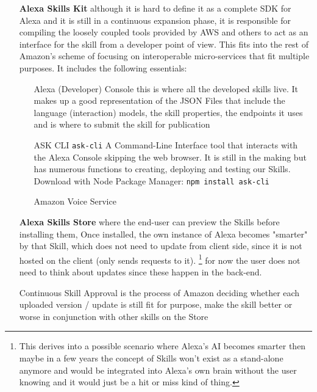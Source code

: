 \begin{itemize}
	\item[\textbf{Alexa Skills Kit}] although it is hard to define it as a complete SDK for Alexa and it is still in a continuous expansion phase, it is responsible for compiling the loosely coupled tools provided by AWS and others to act as an interface for the skill from a developer point of view. This fits into the rest of Amazon's scheme of focusing on interoperable micro-services that fit multiple purposes. It includes the following essentials:
	
	
	\begin{itemize}
		\item [Alexa (Developer) Console] this is where all the developed skills live. It makes up a good representation of the JSON Files that include the language (interaction) models, the skill properties, the endpoints it uses and is where to submit the skill for publication
		\item[ASK CLI] \lstinline|ask-cli| A Command-Line Interface tool that interacts with the Alexa Console skipping the web browser. It is still in the making but has numerous functions to creating, deploying and testing our Skills. Download with Node Package Manager: \texttt{npm install ask-cli}
		\item[Amazon Voice Service] 
	\end{itemize}
	\item[\textbf{Alexa Skills Store}] where the end-user can preview the Skills before installing them, %
	Once installed, the own instance of Alexa becomes "smarter" by that Skill, which does not need to update from client side, since it is not hosted on the client (only sends requests to it). \footnote{This derives into a possible scenario where Alexa's AI becomes smarter then maybe in a few years the concept of Skills won't exist as a stand-alone anymore and would be integrated into Alexa's own brain without the user knowing and it would just be a hit or miss kind of thing.} for now the user does not need to think about updates since these happen in the back-end. 
	
	Continuous Skill Approval is the process of Amazon deciding whether each uploaded version / update is still fit for purpose, make the skill better or worse in conjunction with other skills on the Store %
\end{itemize}


